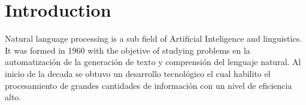 \section{Introduction}

Natural language processing is a sub field of Artificial Inteligence and linguistics. It was formed in 1960 with the objetive of studying problems en la automatización de la generación de texto y comprensión del lenguaje natural. Al inicio de la decada se obtuvo un desarrollo tecnológico el cual habilito el procesamiento de grandes cantidades de información con un nivel de eficiencia alto.